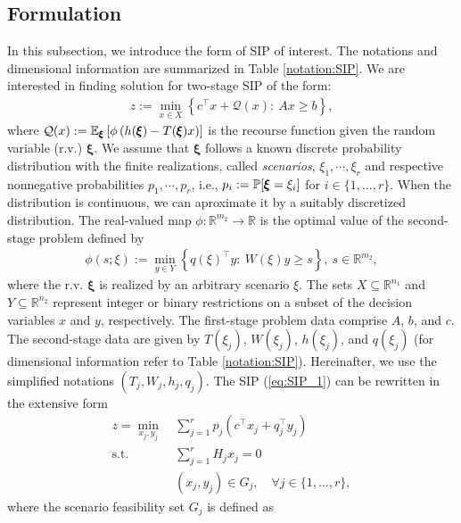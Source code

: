 \subsection{Formulation}
In this subsection, we introduce the form of SIP of interest. The notations and dimensional information are summarized in Table \ref{notation:SIP}. We are interested in finding solution for two-stage SIP of the form: 
\begin{align}
z:=\min_{x\in X}{\left\{c^\top x + \mathcal{Q}(x):\ Ax\ge b\right\}}, \label{eq:SIP_1}
\end{align}
where $\mathcal{Q}(x):=\operatorname*{\mathbb{E}}_{\pmb{\xi}}\left[ \phi\left( h(\pmb{\xi})-T(\pmb{\xi})x \right) \right]$ is the recourse function given the random variable (r.v.) $\pmb{\xi}$. We assume that $\pmb{\xi}$ follows a known discrete probability distribution with the finite realizations, called \textit{scenarios}, $\xi_1,\cdots,\xi_r$ and respective nonnegative probabilities $p_1,\cdots,p_r$, i.e., $p_i:=\operatorname*{\mathbb{P}}[\pmb{\xi}=\xi_i]$ for $i\in\{1,\ldots,r\}$. When the distribution is continuous, we can aproximate it by a suitably discretized distribution. The real-valued map $\phi:\mathbb{R}^{m_2}\to\mathbb{R}$ is the optimal value of the second-stage problem defined by
\begin{align}
\phi(s;\xi):=\min_{y\in Y}\left\{ q(\xi)^\top y:\ W(\xi)y \ge s \right\},\ s\in\mathbb{R}^{m_2},
\end{align}
where the r.v. $\pmb{\xi}$ is realized by an arbitrary scenario $\xi$.
The sets $X\subseteq \mathbb{R}^{n_1}$ and $Y\subseteq\mathbb{R}^{n_2}$ represent integer or binary restrictions on a subset of the decision variables $x$ and $y$, respectively. 
The first-stage problem data comprise $A$, $b$, and $c$. The second-stage data are given by $T(\xi_j)$, $W(\xi_j)$, $h(\xi_j)$, and $q(\xi_j)$ (for dimensional information refer to Table \ref{notation:SIP}). Hereinafter, we use the simplified notations $(T_j,W_j,h_j,q_j)$.
The SIP (\ref{eq:SIP_1}) can be rewritten in the extensive form
\begin{subequations}
\begin{align}
z=\min_{x_j,y_j}\ &\sum_{j=1}^{r}p_j\left(c^{\top}x_j+q_j^{\top}y_j\right)	\label{eq:SIP_2-1}\\ 
\mathrm{s.t.}\ &\sum_{j=1}^{r}H_j x_j=0 \label{eq:SIP_2-2} \\
\ &(x_j,y_j)\in G_j,\quad \forall j\in\{1,\ldots,r\},	\label{eq:SIP_2-3}
\end{align}
\end{subequations}
where the scenario feasibility set $G_j$ is defined as
